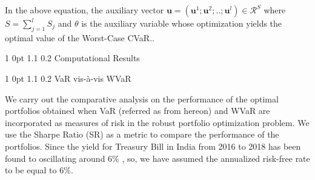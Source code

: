 \documentclass[12pt]{article}
\makeatletter
\numberwithin{equation}{section}
\renewcommand{\section}{
  \@startsection
  {section}%
  {1}%
  {0pt}%
  {1.1\baselineskip}%
  {0.2\baselineskip}%
  {\sc \centering}%
}
\renewcommand{\subsection}{
  \@startsection
  {subsection}%
  {1}%
  {0pt}%
  {1.1\baselineskip}%
  {0.2\baselineskip}%
  {\sc \centering}%
}
\makeatother
\begin{document}
In the above equation, the auxiliary vector $\mathbf{u}=(\mathbf{u}^{1} ; \mathbf{u}^{2} ; .. ; \mathbf{u}^{l}) \in \mathcal{R}^{S}$ where $\displaystyle{S=\sum_{j=1}^{l}S_{j}}$ and $\theta$ is the auxiliary variable whose optimization yields the optimal value of the Worst-Case CVaR..

\section{Computational Results}
\label{Computational_Results}

\subsection{VaR vis-\`a-vis WVaR}

We carry out the comparative analysis on the performance of the optimal portfolios obtained when VaR (referred as  from hereon) and WVaR are incorporated as measures of risk in the robust portfolio optimization problem. We use the Sharpe Ratio (SR) as a metric to compare the performance of the portfolios. Since the yield for Treasury Bill in India from 2016 to 2018 has been found to oscillating around $6\%$ \cite{rbi}, so, we have assumed the annualized risk-free rate to be equal to $6\%$.
\end{document}
